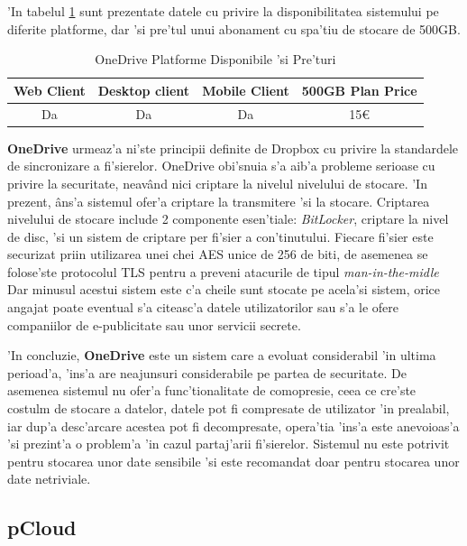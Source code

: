\documentclass[12pt,a4paper,twoside]{report}
\begin{document}
'In tabelul \ref{table:onedrivesystemtable} sunt prezentate datele cu privire la disponibilitatea sistemului pe diferite platforme, dar 'si pre'tul unui abonament cu spa'tiu de stocare de 500GB.
\begin{table}[H]
\centering
\caption{OneDrive Platforme Disponibile 'si Pre'turi}
\begin{tabular}{|c|c|c|c|}          
\hline                      
 Web Client & Desktop client & Mobile Client & 500GB Plan Price\\ [0.5ex]   
\hline                            
Da & Da & Da & 15\euro \\               
\hline                              
\end{tabular}
\label{table:onedrivesystemtable}             
\end{table}
\textbf{OneDrive} urmeaz'a ni'ste principii definite de Dropbox cu privire la standardele de sincronizare a fi'sierelor. OneDrive obi'snuia s'a aib'a probleme serioase cu privire la securitate, neavând nici criptare la nivelul nivelului de stocare. 'In prezent, âns'a sistemul ofer'a criptare la transmitere 'si la stocare. Criptarea nivelului de stocare include 2 componente esen'tiale: \textit{BitLocker}, criptare la nivel de disc, 'si un sistem de criptare per fi'sier a con'tinutului.
Fiecare fi'sier este securizat priin utilizarea unei chei AES unice de 256 de biti, de asemenea se folose'ste protocolul TLS pentru a preveni atacurile de tipul \textit{man-in-the-midle}
Dar minusul acestui sistem este c'a cheile sunt stocate pe acela'si sistem, orice angajat poate eventual s'a citeasc'a datele utilizatorilor sau s'a le ofere companiilor de e-publicitate sau unor servicii secrete.

'In concluzie, \textbf{OneDrive} este un sistem care a evoluat considerabil 'in ultima perioad'a, 'ins'a are neajunsuri considerabile pe partea de securitate. De asemenea sistemul nu ofer'a func'tionalitate de comopresie, ceea ce cre'ste costulm de stocare a datelor, datele pot fi compresate de utilizator 'in prealabil, iar dup'a desc'arcare acestea pot fi decompresate, opera'tia 'ins'a este anevoioas'a 'si prezint'a o problem'a 'in cazul partaj'arii fi'sierelor. Sistemul nu este potrivit pentru stocarea unor date sensibile 'si este recomandat doar pentru stocarea unor date netriviale.


\subsection{pCloud}
\end{document}
